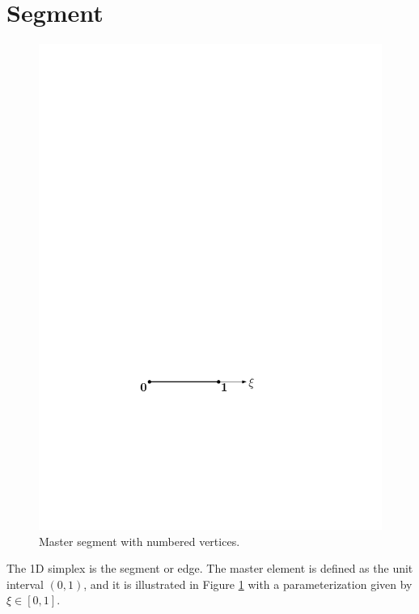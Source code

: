 \section{Segment}
\label{sec:Segment}

\begin{figure}[!ht]
\begin{center}
\includegraphics[scale=0.5]{./figures/MasterSegment.pdf}
\caption{Master segment with numbered vertices.}
\label{fig:masterseg}
\end{center}
\end{figure}

The 1D simplex is the segment or edge. 
The master element is defined as the unit interval $(0,1)$, and it is illustrated in Figure \ref{fig:masterseg} with a parameterization given by $\xi\in[0,1]$.


